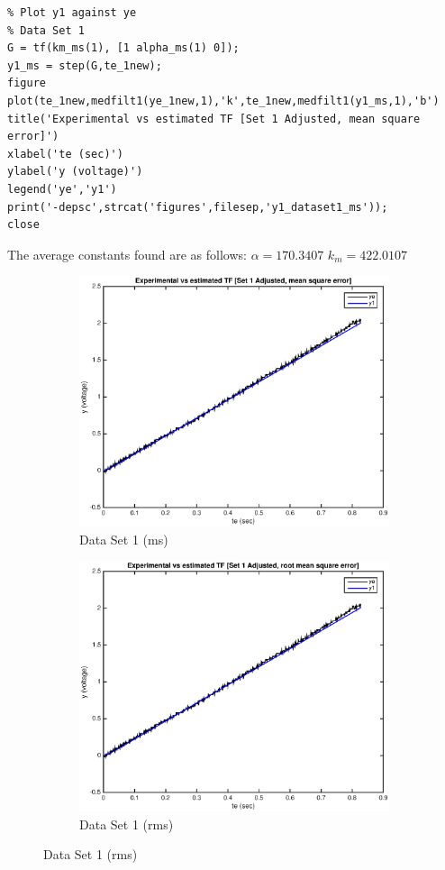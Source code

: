 \documentclass[11pt,a4paper]{article}
\begin{document}
\begin{enumerate}
    \begin{lstlisting}
% Plot y1 against ye
% Data Set 1
G = tf(km_ms(1), [1 alpha_ms(1) 0]);
y1_ms = step(G,te_1new);
figure
plot(te_1new,medfilt1(ye_1new,1),'k',te_1new,medfilt1(y1_ms,1),'b')
title('Experimental vs estimated TF [Set 1 Adjusted, mean square error]')
xlabel('te (sec)')
ylabel('y (voltage)')
legend('ye','y1')
print('-depsc',strcat('figures',filesep,'y1_dataset1_ms'));
close
    \end{lstlisting}
    The average constants found are as follows:
    $\alpha = 170.3407$
    $k_m = 422.0107$
    
   \begin{figure}[H]
	
  \begin{subfigure}{0.5\textwidth}
  \includegraphics[width=0.9\linewidth]{Matlab_Figures/y1_dataset1_ms.eps} 
  \caption{Data Set 1 (ms)}
  \label{fig:subim1}
  \end{subfigure}
  \begin{subfigure}{0.5\textwidth}
  \includegraphics[width=0.9\linewidth]{Matlab_Figures/y1_dataset1_rms.eps}
  \caption{Data Set 1 (rms)}
  \label{fig:subim2}
  \end{subfigure}
  

\end{figure}
\end{enumerate}
\end{document}
